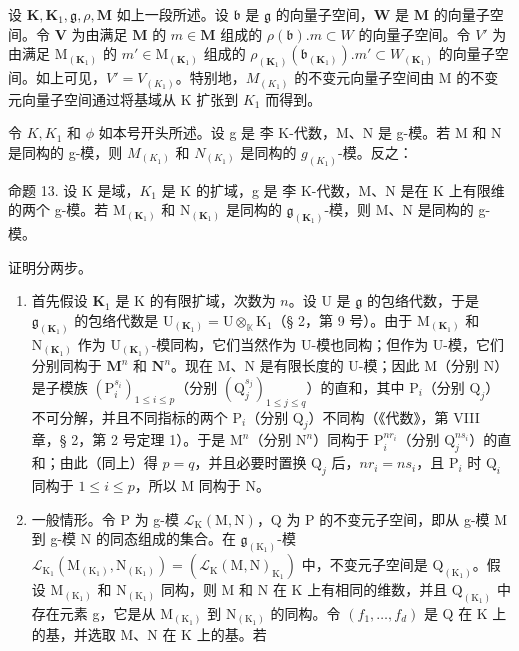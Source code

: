 设 \(\mathbf{K}, \mathbf{K}_{1}, \mathfrak{g}, \rho, \mathbf{M}\) 如上一段所述。设 \(\mathfrak{b}\) 是 \(\mathfrak{g}\) 的向量子空间，\(\mathbf{W}\) 是 \(\mathbf{M}\) 的向量子空间。令 \(\mathbf{V}\) 为由满足 \(\mathbf{M}\) 的 \(m \in \mathbf{M}\) 组成的 \(\rho(\mathfrak{b}). m \subset W\) 的向量子空间。令 \(V'\) 为由满足 \(\mathrm{M}_{(\mathbf{K}_{1})}\) 的 \(m' \in \mathrm{M}_{(\mathbf{K}_{1})}\) 组成的 \(\rho_{(\mathbf{K}_{1})}(\mathfrak{b}_{(\mathbf{K}_{1})}). m' \subset W_{(\mathbf{K}_{1})}\) 的向量子空间。如上可见，\(V' = V_{(K_1)}\)。特别地，\(M_{(K_1)}\) 的不变元向量子空间由 M 的不变元向量子空间通过将基域从 K 扩张到 \(K_1\) 而得到。

令 \(K, K_{1}\) 和 \(\phi\) 如本号开头所述。设 g 是 李 K-代数，M、N 是 g-模。若 M 和 N 是同构的 g-模，则 \(M_{(K_{1})}\) 和 \(N_{(K_{1})}\) 是同构的 \(g_{(K_{1})}\)-模。反之：

命题 13. 设 K 是域，\(K_{1}\) 是 K 的扩域，g 是 李 K-代数，M、N 是在 K 上有限维的两个 g-模。若 \(\mathrm{M}_{(\mathbf{K}_{1})}\) 和 \(\mathrm{N}_{(\mathbf{K}_{1})}\) 是同构的 \(\mathfrak{g}_{(\mathbf{K}_{1})}\)-模，则 M、N 是同构的 g-模。

证明分两步。

\begin{enumerate}
\def\labelenumi{(\arabic{enumi})}
\item
  首先假设 \(\mathbf{K}_1\) 是 K 的有限扩域，次数为 \(n\)。设 U 是 \(\mathfrak{g}\) 的包络代数，于是 \(\mathfrak{g}_{(\mathbf{K}_1)}\) 的包络代数是 \(\mathrm{U}_{(\mathbf{K}_1)} = \mathrm{U} \otimes_{\mathbb{K}} \mathrm{K}_1\)（§ 2，第 9 号）。由于 \(\mathrm{M}_{(\mathbf{K}_1)}\) 和 \(\mathrm{N}_{(\mathbf{K}_1)}\) 作为 \(\mathrm{U}_{(\mathbf{K}_1)}\)-模同构，它们当然作为 U-模也同构；但作为 U-模，它们分别同构于 \(\mathbf{M}^n\) 和 \(\mathbf{N}^n\)。现在 M、N 是有限长度的 U-模；因此 M（分别 N）是子模族 \((\mathrm{P}_i^{s_i})_{1 \leqslant i \leqslant p}\)（分别 \((\mathrm{Q}_j^{s_j})_{1 \leqslant j \leqslant q}\)）的直和，其中 \(\mathrm{P}_i\)（分别 \(\mathrm{Q}_j\)）不可分解，并且不同指标的两个 \(\mathrm{P}_i\)（分别 \(\mathrm{Q}_j\)）不同构（《代数》，第 VIII 章，§ 2，第 2 号定理 1）。于是 \(\mathrm{M}^n\)（分别 \(\mathrm{N}^n\)）同构于 \(\mathrm{P}_i^{nr_i}\)（分别 \(\mathrm{Q}_j^{ns_i}\)）的直和；由此（同上）得 \(p = q\)，并且必要时置换 \(\mathrm{Q}_j\) 后，\(nr_i = ns_i\)，且 \(\mathrm{P}_i\) 时 \(\mathrm{Q}_i\) 同构于 \(1 \leqslant i \leqslant p\)，所以 M 同构于 N。
\item
  一般情形。令 P 为 g-模 \(\mathcal{L}_{\mathrm{K}}(\mathrm{M},\mathrm{N})\)，Q 为 P 的不变元子空间，即从 g-模 M 到 g-模 N 的同态组成的集合。在 \(\mathfrak{g}_{(\mathrm{K}_{1})}\)-模 \(\mathcal{L}_{\mathrm{K}_{1}}(\mathrm{M}_{(\mathrm{K}_{1})},\mathrm{N}_{(\mathrm{K}_{1})})=(\mathcal{L}_{\mathrm{K}}(\mathrm{M},\mathrm{N})_{\mathrm{K}_{1}})\) 中，不变元子空间是 \(\mathrm{Q}_{(\mathrm{K}_{1})}\)。假设 \(\mathrm{M}_{(\mathrm{K}_{1})}\) 和 \(\mathrm{N}_{(\mathrm{K}_{1})}\) 同构，则 M 和 N 在 K 上有相同的维数，并且 \(\mathrm{Q}_{(\mathrm{K}_{1})}\) 中存在元素 g，它是从 \(\mathrm{M}_{(\mathrm{K}_{1})}\) 到 \(\mathrm{N}_{(\mathrm{K}_{1})}\) 的同构。令 \((f_{1},\ldots,f_{d})\) 是 Q 在 K 上的基，并选取 M、N 在 K 上的基。若
\end{enumerate}

